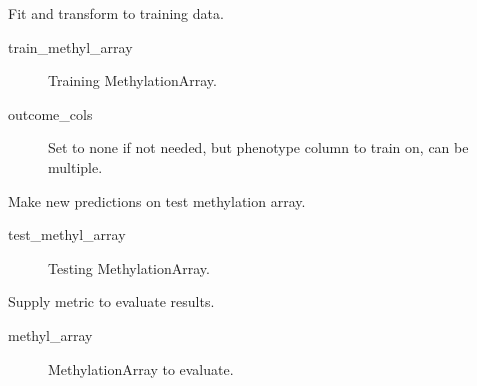 \documentclass[letterpaper,10pt,english]{sphinxmanual}
\begin{document}
\begin{fulllineitems}

\begin{fulllineitems}
\label{\detokenize{index:pymethylprocess.general_machine_learning.MachineLearning.fit_transform}}
Fit and transform to training data.
\begin{description}
\item[{train\_methyl\_array}] \leavevmode
Training MethylationArray.

\item[{outcome\_cols}] \leavevmode
Set to none if not needed, but phenotype column to train on, can be multiple.

\end{description}

\end{fulllineitems}


\begin{fulllineitems}
\label{\detokenize{index:pymethylprocess.general_machine_learning.MachineLearning.predict}}
Make new predictions on test methylation array.
\begin{description}
\item[{test\_methyl\_array}] \leavevmode
Testing MethylationArray.

\end{description}

\end{fulllineitems}


\begin{fulllineitems}
\label{\detokenize{index:pymethylprocess.general_machine_learning.MachineLearning.return_outcome_metric}}
Supply metric to evaluate results.
\begin{description}
\item[{methyl\_array}] \leavevmode
MethylationArray to evaluate.


\end{description}
\end{fulllineitems}
\end{fulllineitems}
\end{document}
